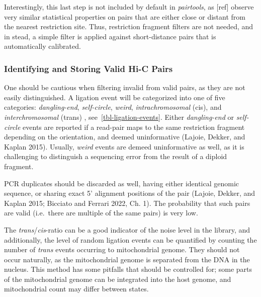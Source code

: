 \documentclass[
  11pt,
  a4paper,
]{scrbook}
\let\oldemph\emph
\renewcommand\emph[1]{\oldemph{\color{gray}#1}}
\begin{document}
Interestingly, this last step is not included by default in
\emph{pairtools}, as {[}ref{]} observe very similar statistical
properties on pairs that are either close or distant from the nearest
restriction site. Thus, restriction fragment filters are not needed, and
in stead, a simple filter is applied against short-distance pairs that
is automatically calibrated.

\subsubsection{Identifying and Storing Valid Hi-C
Pairs}\label{identifying-and-storing-valid-hi-c-pairs}

One should be cautious when filtering invalid from valid pairs, as they
are not easily distinguished. A ligation event will be categorized into
one of five categories: \emph{dangling-end}, \emph{self-circle},
\emph{weird}, \emph{intrachromosomal} (cis), and \emph{interchromosomal}
(trans) , see~\ref{tbl-ligation-events}. Either \emph{dangling-end} or
\emph{self-circle} events are reported if a read-pair maps to the same
restriction fragment depending on the orientation, and deemed
uninformative (Lajoie, Dekker, and Kaplan 2015). Usually, \emph{weird}
events are demeed uninformative as well, as it is challenging to
distinguish a sequencing error from the result of a diploid fragment.

PCR duplicates should be discarded as well, having either identical
genomic sequence, or sharing exact 5' alignment positions of the pair
(Lajoie, Dekker, and Kaplan 2015; Bicciato and Ferrari 2022, Ch. 1). The
probability that such pairs are valid (i.e.~there are multiple of the
same pairs) is very low.

The \emph{trans}/\emph{cis}-ratio can be a good indicator of the noise
level in the library, and additionally, the level of random ligation
events can be quantified by counting the number of \emph{trans} events
occurring to mitochondrial genome. They should not occur naturally, as
the mitochondrial genome is separated from the DNA in the nucleus. This
method has some pitfalls that should be controlled for; some parts of
the mitochondrial genome can be integrated into the host genome, and
mitochondrial count may differ between states.

\small
\end{document}
